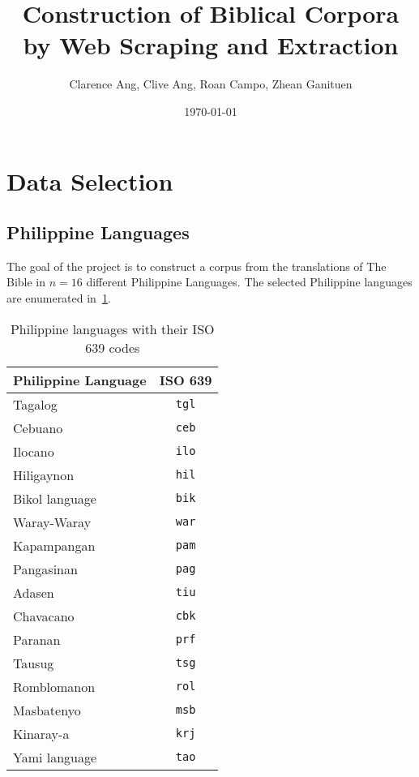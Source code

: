 \documentclass{article}
\title{Construction of Biblical Corpora by Web Scraping and Extraction}
\author{Clarence Ang, Clive Ang, Roan Campo, Zhean Ganituen}
\date{\today}
\begin{document}
\maketitle
\tableofcontents

\section{Data Selection}

\subsection{Philippine Languages}

The goal of the project is to construct a corpus from the translations of The
Bible in \( n = 16 \) different Philippine Languages. The selected Philippine
languages are enumerated in~\cref{tab:ph_languages}.

\begin{table}[h!]
    \centering
    \begin{tabular}{lc}
        \hline
        \textbf{Philippine Language} & \textbf{ISO 639} \\
        \hline
        Tagalog                      & \texttt{tgl}     \\
        Cebuano                      & \texttt{ceb}     \\
        Ilocano                      & \texttt{ilo}     \\
        Hiligaynon                   & \texttt{hil}     \\
        Bikol language~\footnotemark & \texttt{bik}     \\
        Waray-Waray                  & \texttt{war}     \\
        Kapampangan                  & \texttt{pam}     \\
        Pangasinan                   & \texttt{pag}     \\
        Adasen                       & \texttt{tiu}     \\
        Chavacano                    & \texttt{cbk}     \\
        Paranan                      & \texttt{prf}     \\
        Tausug                       & \texttt{tsg}     \\
        Romblomanon                  & \texttt{rol}     \\
        Masbatenyo                   & \texttt{msb}     \\
        Kinaray-a                    & \texttt{krj}     \\
        Yami language                & \texttt{tao}     \\
        \hline
    \end{tabular}
    \caption{Philippine languages with their ISO 639 codes}\label{tab:ph_languages}
\end{table}
\end{document}

